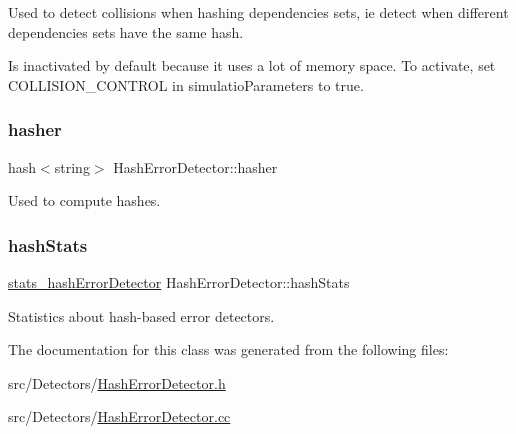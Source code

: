 Used to detect collisions when hashing dependencies sets, ie detect when different dependencies sets have the same hash. 

Is inactivated by default because it uses a lot of memory space. To activate, set C\+O\+L\+L\+I\+S\+I\+O\+N\+\_\+\+C\+O\+N\+T\+R\+OL in simulatio\+Parameters to true. \mbox{\label{class_hash_error_detector_a5193286d834f087e03b7299e81b60509}} 
\subsubsection{\texorpdfstring{hasher}{hasher}}
{\footnotesize\ttfamily hash$<$string$>$ Hash\+Error\+Detector\+::hasher\hspace{0.3cm}{\ttfamily [private]}}



Used to compute hashes. 

\mbox{\label{class_hash_error_detector_aec82c653679515b306b34eb075cf37fd}} 
\subsubsection{\texorpdfstring{hash\+Stats}{hashStats}}
{\footnotesize\ttfamily \hyperlink{_hash_error_detector_8h_afcf148bcfe372c25deda29220815b9e0}{stats\+\_\+hash\+Error\+Detector} Hash\+Error\+Detector\+::hash\+Stats\hspace{0.3cm}{\ttfamily [private]}}



Statistics about hash-\/based error detectors. 



The documentation for this class was generated from the following files\+:\begin{DoxyCompactItemize}
\item 
src/\+Detectors/\hyperlink{_hash_error_detector_8h}{Hash\+Error\+Detector.\+h}\item 
src/\+Detectors/\hyperlink{_hash_error_detector_8cc}{Hash\+Error\+Detector.\+cc}\end{DoxyCompactItemize}
